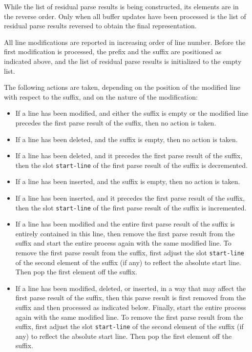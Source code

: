 While the list of residual parse results is being constructed, its
elements are in the reverse order.  Only when all buffer updates have
been processed is the list of residual parse results reversed to
obtain the final representation.

All line modifications are reported in increasing order of line
number.  Before the first modification is processed, the prefix and
the suffix are positioned as indicated above, and the list of residual
parse results is initialized to the empty list.

The following actions are taken, depending on the position of the
modified line with respect to the suffix, and on the nature of the
modification:

\begin{itemize}
\item If a line has been modified, and either the suffix is empty or
  the modified line precedes the first parse result of the suffix,
  then no action is taken.
\item If a line has been deleted, and the suffix is empty, then no
  action is taken.
\item If a line has been deleted, and it precedes the first parse
  result of the suffix, then the slot \texttt{start-line} of the first
  parse result of the suffix is decremented.
\item If a line has been inserted, and the suffix is empty, then no
  action is taken.
\item If a line has been inserted, and it precedes the first parse
  result of the suffix, then the slot \texttt{start-line} of the first
  parse result of the suffix is incremented.
\item If a line has been modified and the entire first parse result of
  the suffix is entirely contained in this line, then remove the first
  parse result from the suffix and start the entire process again with
  the same modified line.  To remove the first parse result from the
  suffix, first adjust the slot \texttt{start-line} of the second
  element of the suffix (if any) to reflect the absolute start line.
  Then pop the first element off the suffix.
\item If a line has been modified, deleted, or inserted, in a way that
  may affect the first parse result of the suffix, then this parse
  result is first removed from the suffix and then processed as
  indicated below.  Finally, start the entire process again with the
  same modified line.  To remove the first parse result from the
  suffix, first adjust the slot \texttt{start-line} of the second
  element of the suffix (if any) to reflect the absolute start line.
  Then pop the first element off the suffix.
\end{itemize}
